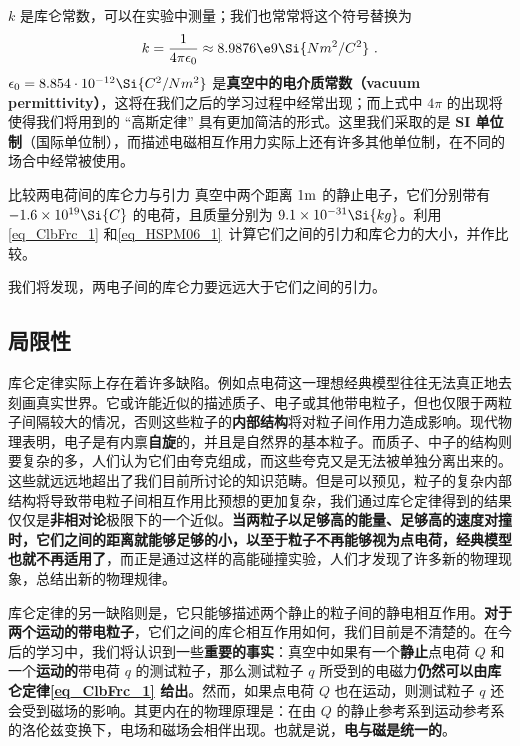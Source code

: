 $k$ 是库仑常数，可以在实验中测量；我们也常常将这个符号替换为
\begin{equation}
k = \frac{1}{4\pi\epsilon_0} \approx 8.9876\e9 \Si{N m^2/C^2}~.
\end{equation}
$\epsilon_0=8.854\cdot 10^{-12} \Si{C^2/Nm^2}$ 是\textbf{真空中的电介质常数（vacuum permittivity）}，这将在我们之后的学习过程中经常出现；而上式中 $4\pi$ 的出现将使得我们将用到的 “高斯定律” 具有更加简洁的形式。这里我们采取的是\textbf{ SI 单位制}（国际单位制），而描述电磁相互作用力实际上还有许多其他单位制，在不同的场合中经常被使用。

\begin{exercise}{比较两电荷间的库仑力与引力}
真空中两个距离 $1 \rm m$ 的静止电子，它们分别带有 $-1.6\times 10^{19} \Si{C}$ 的电荷，且质量分别为 $9.1\times 10^{-31} \Si{kg}$。利用\autoref{eq_ClbFrc_1} 和\autoref{eq_HSPM06_1}~计算它们之间的引力和库仑力的大小，并作比较。
\end{exercise}
我们将发现，两电子间的库仑力要远远大于它们之间的引力。
\subsection{局限性}
库仑定律实际上存在着许多缺陷。例如点电荷这一理想经典模型往往无法真正地去刻画真实世界。它或许能近似的描述质子、电子或其他带电粒子，但也仅限于两粒子间隔较大的情况，否则这些粒子的\textbf{内部结构}将对粒子间作用力造成影响。现代物理表明，电子是有内禀\textbf{自旋}的，并且是自然界的基本粒子。而质子、中子的结构则要复杂的多，人们认为它们由夸克组成，而这些夸克又是无法被单独分离出来的。这些就远远地超出了我们目前所讨论的知识范畴。但是可以预见，粒子的复杂内部结构将导致带电粒子间相互作用比预想的更加复杂，我们通过库仑定律得到的结果仅仅是\textbf{非相对论}极限下的一个近似。\textbf{当两粒子以足够高的能量、足够高的速度对撞时，它们之间的距离就能够足够的小，以至于粒子不再能够视为点电荷，经典模型也就不再适用了}，而正是通过这样的高能碰撞实验，人们才发现了许多新的物理现象，总结出新的物理规律。

库仑定律的另一缺陷则是，它只能够描述两个静止的粒子间的静电相互作用。\textbf{对于两个运动的带电粒子}，它们之间的库仑相互作用如何，我们目前是不清楚的。在今后的学习中，我们将认识到一些\textbf{重要的事实}：真空中如果有一个\textbf{静止}点电荷 $Q$ 和一个\textbf{运动的}带电荷 $q$ 的测试粒子，那么测试粒子 $q$ 所受到的电磁力\textbf{仍然可以由库仑定律\autoref{eq_ClbFrc_1} 给出}。然而，如果点电荷 $Q$ 也在运动，则测试粒子 $q$ 还会受到磁场的影响。其更内在的物理原理是：在由 $Q$ 的静止参考系到运动参考系的洛伦兹变换下，电场和磁场会相伴出现。也就是说，\textbf{电与磁是统一的}。
